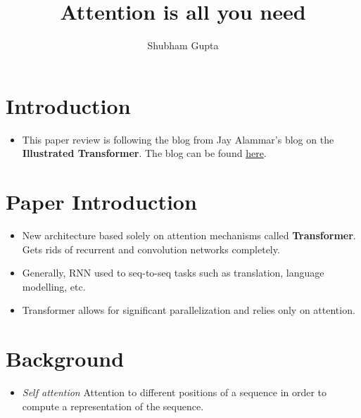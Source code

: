 \documentclass[a4paper]{article}
\title{Attention is all you need}
\author{Shubham Gupta}
\begin{document}
\maketitle
\section{Introduction}
\begin{itemize}
    \item This paper review is following the blog from Jay Alammar's blog on the \textbf{Illustrated Transformer}. The blog can be found \href{https://jalammar.github.io/illustrated-transformer/}{here}.  
\end{itemize}
\section{Paper Introduction}
\begin{itemize}
    \item New architecture based solely on attention mechanisms called \textbf{Transformer}. Gets rids of recurrent and convolution networks completely.  
    \item Generally, RNN used to seq-to-seq tasks such as translation, language modelling, etc.
    \item Transformer allows for significant parallelization and relies only on attention.
\end{itemize}
\section{Background}
\begin{itemize}
    \item \textit{Self attention} Attention to different positions of a sequence in order to compute a representation of the sequence.
\end{itemize}
\end{document}
